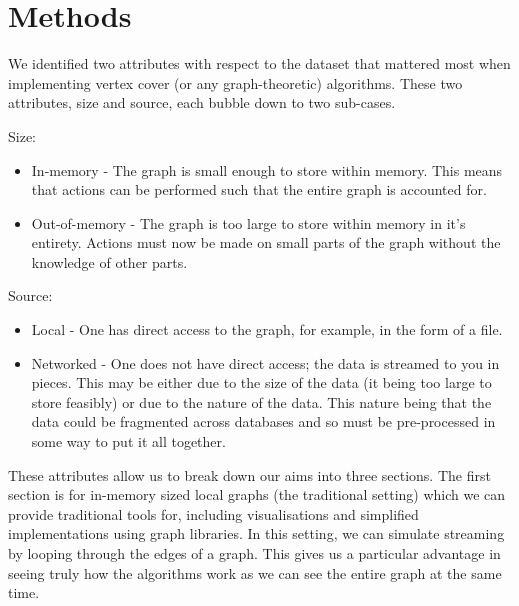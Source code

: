 \section{Methods}

We identified two attributes with respect to the dataset that mattered most
when implementing vertex cover (or any graph-theoretic) algorithms. These two
attributes, size and source, each bubble down to two sub-cases.

Size:

\begin{itemize}
    \item
          In-memory - The graph is small enough to store within memory. This
          means that actions can be performed such that the entire graph is
          accounted for.
    \item
          Out-of-memory - The graph is too large to store within memory in it's
          entirety. Actions must now be made on small parts of the graph
          without the knowledge of other parts.
\end{itemize}

Source:

\begin{itemize}
    \item
          Local - One has direct access to the graph, for example, in the form
          of a file.
    \item
          Networked - One does not have direct access; the data is streamed to
          you in pieces. This may be either due to the size of the data (it
          being too large to store feasibly) or due to the nature of the data.
          This nature being that the data could be fragmented across databases
          and so must be pre-processed in some way to put it all together.
\end{itemize}

These attributes allow us to break down our aims into three sections. The first
section is for in-memory sized local graphs (the traditional setting) which we
can provide traditional tools for, including visualisations and simplified
implementations using graph libraries. In this setting, we can simulate
streaming by looping through the edges of a graph. This gives us a particular
advantage in seeing truly how the algorithms work as we can see the entire
graph at the same time.

